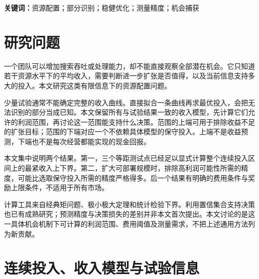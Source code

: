 \begin{abstract}
在机会只能获得一次奖励、增加搜索资源会提高捕获概率的环境中，少量收入试验能支持怎样的投入决策？本文把投入强度建模为连续变量，不预设未知机会的数量和组成。给定三个等距测试点的平均收入，利用矩约束求出不能进一步缩小的收入范围，并据此计算最高可能利润和最优保守投入。两者都来自同一组模型约束，但对测量误差的要求不同：当单位资源费用低于一个由读数决定的阈值时，准确报告最高可能利润需要随最大部署强度平方增长的观测次数；保守投入的充分观测次数则可以不随该上限增长。已知总奖励上限会使这种增长最终停止。一个已知有限机会数、只有单位奖励的构造说明，即使允许连续选择低强度试验，饱和前的统计困难仍然存在。数值部分只保留一个有限机会池案例，展示利润范围、连续投入选择和含噪数据下的完整停止过程。全部结果由本机重新执行程序生成；案例为合成数据，尚不构成真实市场的应用验证。
\end{abstract}
\noindent\textbf{关键词：}资源配置；部分识别；稳健优化；测量精度；机会捕获

\section{研究问题}
一个团队可以增加搜索吞吐或处理能力，却不能直接观察全部潜在机会。它只知道若干资源水平下的平均收入，需要判断进一步扩张是否值得，以及当前信息支持多大的投入。本文研究这类有限信息下的资源配置问题。

少量试验通常不能确定完整的收入曲线。直接拟合一条曲线再求最优投入，会把无法识别的部分当成已知。本文保留所有与试验结果一致的收入模型，先计算它们允许的利润范围，再讨论这一范围能支持什么决策。范围的上端可用于排除收益不足的扩张目标；范围的下端对应一个不依赖具体模型的保守投入。上端不是收益预测，下端也不是每次经营都能实现的现金回报。

本文集中说明两个结果。第一，三个等距测试点已经足以显式计算整个连续投入区间上的最紧收入上下界。第二，扩大可部署规模时，排除高利润可能性所需的精度，可能比选取保守投入所需的精度严格得多。后一个结果有明确的费用条件与奖励上限条件，不适用于所有市场。

计算工具来自经典矩问题\cite{dette}、极小极大定理\cite{sion}和统计检验下界。利用置信集合支持决策也已有成熟研究\cite{bgk}；预测精度与决策损失的差别并非本文首次提出\cite{spo}。本文讨论的是这一具体机会机制下可计算的利润范围、费用阈值及测量需求，不把上述通用方法列为新贡献。

\section{连续投入、收入模型与试验信息}
